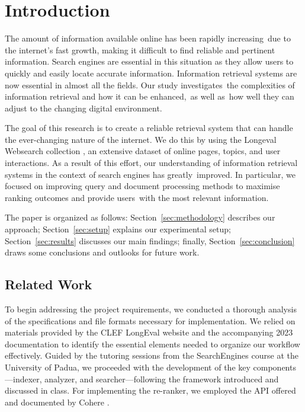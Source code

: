 \section{Introduction}
\label{sec:introduction}

The amount of information available online has been rapidly increasing due to the internet's fast growth, making it difficult to find reliable and pertinent information. Search engines are essential in this situation as they allow users to quickly and easily locate accurate information. Information retrieval systems are now essential in almost all the fields. Our study investigates the complexities of information retrieval and how it can be enhanced, as well as how well they can adjust to the changing digital environment. 

The goal of this research is to create a reliable retrieval system that can handle the ever-changing nature of the internet. We do this by using the Longeval Websearch collection \cite{longeval2025}, an extensive dataset of online pages, topics, and user interactions. As a result of this effort, our understanding of information retrieval systems in the context of search engines has greatly improved. In particular, we focused on improving query and document processing methods to maximise ranking outcomes and provide users with the most relevant information.

The paper is organized as follows: Section~\ref{sec:methodology} describes our approach; Section~\ref{sec:setup} explains our experimental setup; Section~\ref{sec:results} discusses our main findings; finally, Section~\ref{sec:conclusion} draws some conclusions and outlooks for future work.

\subsection{Related Work}
To begin addressing the project requirements, we conducted a thorough analysis of the specifications and file formats necessary for implementation. We relied on materials provided by the CLEF LongEval \cite{longeval2025} website and the accompanying 2023 documentation \cite{alkhalifa2023clef} to identify the essential elements needed to organize our workflow effectively. Guided by the tutoring sessions from the SearchEngines course at the University of Padua, we proceeded with the development of the key components—indexer, analyzer, and searcher—following the framework introduced and discussed in class. For implementing the re-ranker, we employed the API offered and documented by Cohere \cite{cohereAbout2025}.